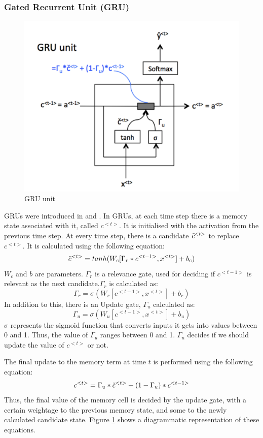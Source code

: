 \subsubsection{Gated Recurrent Unit (GRU)}
 \begin{figure}[h]
    \centering
    \includegraphics[height=0.25\paperheight]{Figures/GRU_cell.png}
    \caption[GRU Unit]{GRU unit\cite{cavaioni_deeplearning_2018}}
    \label{fig:gru_unit}
\end{figure}
GRUs were introduced in \cite{cho_properties_2014} and \cite{chung_empirical_2014}.
In GRUs, at each time step there is a memory state associated with it, called \(c^{<t>}\). It is initialised with the activation from the previous time step. At every time step, there is a candidate \(\Tilde{c}^{<t>}\) to replace \(c^{<t>}\). It is calculated using the following equation:
\[\Tilde{c}^{<t>}=tanh(W_c[\Gamma_r*c^{<t-1>},x^{<t>}]+b_c)\]
\(W_c\) and \(b\) are parameters. \(\Gamma_r\) is a relevance gate, used for deciding if \(c^{<t-1>}\) is relevant as the next candidate.\(\Gamma_r\) is calculated as:
\[\Gamma_r = \sigma(W_r[c^{<t-1>},x^{<t>}]+b_r)\]
In addition to this, there is an Update gate, \(\Gamma_u\) calculated as:
\[\Gamma_u = \sigma(W_u[c^{<t-1>},x^{<t>}]+b_u)\]
 \(\sigma\) represents the sigmoid function that converts inputs it gets into values between 0 and 1. Thus, the value of \(\Gamma_u\) ranges between 0 and 1. \(\Gamma_u\) decides if we should update the value of \(c^{<t>}\) or not. 
 
 The final update to the memory term at time \(t\) is performed using the following equation:
 \[c^{<t>}=\Gamma_u*\Tilde{c}^{<t>} + (1-\Gamma_u)*{c}^{<t-1>} \]
 Thus, the final value of the memory cell is decided by the update gate, with a certain weightage to the previous memory state, and some to the newly calculated candidate state. Figure \ref{fig:gru_unit} shows a diagrammatic representation of these equations.
 

